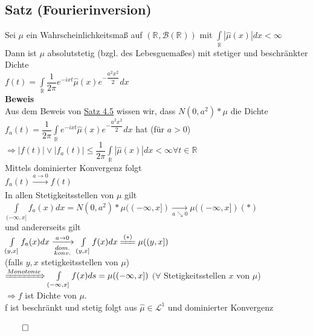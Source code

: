 \documentclass[german,10pt,oneside, fleqn, a4paper]{article}
\newcommand {\R}	{\mathbb{R}}
\newcommand{\Ra}	{\Rightarrow}
\newcommand{\ra}{\rightarrow}
\newcommand{\brc}[1]{\left(#1\right)}
\newcommand{\QED}{\begin{flushright}$\qed$\end{flushright}}
\newcommand{\mc}[1]{\mathcal{#1}}
\newcommand{\lp}[1]{\mc{L}^{#1}}
\newcommand{\beweis}{\textbf{Beweis}\\}
\newcommand{\1}[1]{1_{#1}}
\newcommand{\2}[1]{\1{\brac{#1}}}
\newcommand{\xr}[2][]{\xrightarrow[#1]{#2}}
\newcommand{\rbor}[1][d]{\brc{\R^{#1},\mc{B}\brc{\R^{#1}}}}
\newcommand{\intr}{\int\limits_\R}
\begin{document}
\subsection{Satz (Fourierinversion)}
\label{4.12}
Sei $\mu$ ein Wahrscheinlichkeitsmaß auf $\rbor[]$ mit $\intr|\widehat{\mu}(x)|dx<\infty$\\
Dann ist $\mu$ absolutstetig (bzgl. des Lebesguemaßes) mit stetiger und beschränkter Dichte\\
$f(t)=\intr\dfrac{1}{2\pi}e^{-ixt}\widehat{\mu}(x)e^{-\dfrac{a^2x^2}{2}}dx$\\
\beweis
Aus dem Beweis von \hyperref[4.5]{Satz 4.5} wissen wir, dass $N(0,a^2)*\mu$ die Dichte\\
$f_a(t)=\dfrac{1}{2\pi}\intr e^{-ixt}\widehat{\mu}(x)e^{-\dfrac{a^2x^2}{2}}dx$ hat (für $a>0$)\\
$\Ra |f(t)|\vee|f_a(t)|\leq\dfrac{1}{2\pi}\intr|\widehat{\mu}(x)|dx<\infty\forall t\in\R$\\
Mittels dominierter Konvergenz folgt\\
$f_a(t)\xr{a\ra0}f(t)$\\
In allen Stetigkeitsstellen von $\mu$ gilt \\
$\int\limits_{(-\infty,x]}f_a(x)dx=N(0,a^2)*\mu((-\infty,x])\xr[a\searrow0]{}\mu((-\infty,x])   (*)$\\
und andererseits gilt \\
$\int\limits_{(y,x]}f_a(x)dx\xr[\substack{dom.\\konv.}]{a\ra0}\int\limits_{(y,x]}f(x)dx\xlongequal{(*)}\mu((y,x])$\\
(falls $y,x$ stetigkeitsstellen von $\mu$)\\
$\xRightarrow{Monotonie}\int\limits_{(-\infty,x]}f(x)ds=\mu((-\infty,x])$ $(\forall$ Stetigkeitsstellen $x$ von $\mu$)\\
$\Ra f$ ist Dichte von $\mu$.\\
f ist beschränkt und stetig folgt aus $\widehat{\mu}\in\lp{1}$ und dominierter Konvergenz\QED
\end{document}

